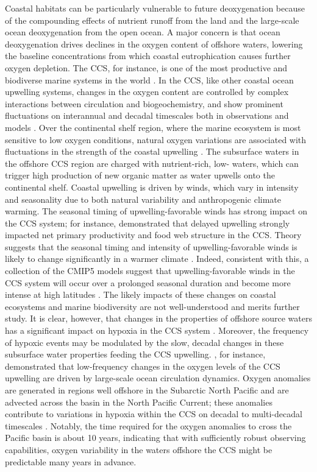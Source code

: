 \documentclass{report_chapter}
\begin{document}
Coastal habitats can be particularly vulnerable to future deoxygenation because of the compounding effects of nutrient runoff from the land and the large-scale ocean deoxygenation from the open ocean.
A major concern is that ocean deoxygenation drives declines in the oxygen content of offshore waters, lowering the baseline concentrations from which coastal eutrophication causes further oxygen depletion.
The CCS, for instance, is one of the most productive and biodiverse marine systems in the world \citep{Block-Jonsen-etal-2011,Carr-2001}.
In the CCS, like other coastal ocean upwelling systems, changes in the oxygen content are controlled by complex interactions between circulation and biogeochemistry, and show prominent fluctuations on interannual and decadal timescales both in observations and models \citep[section~\ref{loc:toe};][]{Bograd-Castro-etal-2008,Deutsch-Brix-etal-2011}.
Over the continental shelf region, where the marine ecosystem is most sensitive to low oxygen conditions, natural oxygen variations are associated with fluctuations in the strength of the coastal upwelling \citep{Connolly-Hickey-etal-2010,Chan-Barth-etal-2008}.
The subsurface waters in the offshore CCS region are charged with nutrient-rich, low-\OO{} waters, which can trigger high production of new organic matter as water upwells onto the continental shelf.
Coastal upwelling is driven by winds, which vary in intensity and seasonality due to both natural variability and anthropogenic climate warming.
The seasonal timing of upwelling-favorable winds has strong impact on the CCS system; for instance, \citet{Barth-Menge-etal-2007} demonstrated that delayed upwelling strongly impacted net primary productivity and food web structure in the CCS.
Theory suggests that the seasonal timing and intensity of upwelling-favorable winds is likely to change significantly in a warmer climate \citep{Bakun-1990}.
Indeed, consistent with this, a collection of the CMIP5 models suggest that upwelling-favorable winds in the CCS system will occur over a prolonged seasonal duration and become more intense at high latitudes \citep{Wang-Gouhier-etal-2015}.
The likely impacts of these changes on coastal ecosystems and marine biodiversity are not well-understood and merits further study.
It is clear, however, that changes in the properties of offshore source waters has a significant impact on hypoxia in the CCS system \citep{Grantham-Chan-etal-2004,Bograd-Castro-etal-2008}.
Moreover, the frequency of hypoxic events may be modulated by the slow, decadal changes in these subsurface water properties feeding the CCS upwelling.
\citet{Pozo-Buil-Di-Lorenzo-2017}, for instance, demonstrated that low-frequency changes in the oxygen levels of the CCS upwelling are driven by large-scale ocean circulation dynamics.
Oxygen anomalies are generated in regions well offshore in the Subarctic North Pacific and are advected across the basin in the North Pacific Current; these anomalies contribute to variations in hypoxia within the CCS on decadal to multi-decadal timescales \citep{Pozo-Buil-Di-Lorenzo-2017}.
Notably, the time required for the oxygen anomalies to cross the Pacific basin is about 10 years, indicating that with sufficiently robust observing capabilities, oxygen variability in the waters offshore the CCS might be predictable many years in advance.
\end{document}
